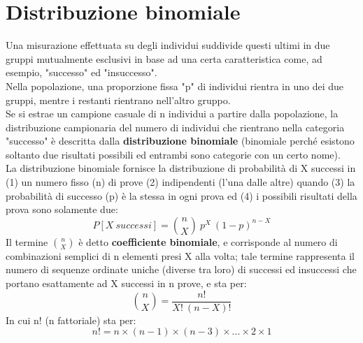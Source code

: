 \documentclass[drafts, 10pt]{book}
\begin{document}
\section{Distribuzione binomiale}
Una misurazione effettuata su degli individui suddivide questi ultimi in due gruppi mutualmente esclusivi in base ad una certa caratteristica come, ad esempio, "successo" ed "insuccesso".
\\
Nella popolazione, una proporzione fissa "p" di individui rientra in uno dei due gruppi, mentre i restanti rientrano nell'altro gruppo.
\\
Se si estrae un campione casuale di n individui a partire dalla popolazione, la distribuzione campionaria del numero di individui che rientrano nella categoria "successo" è descritta dalla \textbf{distribuzione binomiale} (binomiale perché esistono soltanto due risultati possibili ed entrambi sono categorie con un certo nome).
\\
La distribuzione binomiale fornisce la distribuzione di probabilità di X successi in (1) un numero fisso (n) di prove (2) indipendenti (l'una dalle altre) quando (3) la probabilità di successo (p) è la stessa in ogni prova ed (4) i possibili risultati della prova sono solamente due:
\begin{equation}
P[X \ successi] = \binom{n}{X} \ p^X \ (1 - p)^{n-X}
\end{equation}
Il termine $\binom{n}{X}$ è detto \textbf{coefficiente binomiale}, e corrisponde al numero di combinazioni semplici di n elementi presi X alla volta; tale termine rappresenta il numero di sequenze ordinate uniche (diverse tra loro) di successi ed insuccessi che portano esattamente ad X successi in n prove, e sta per:
\begin{equation}
\binom{n}{X} = \frac{n!}{X!\ (n - X)!}
\end{equation}
In cui n! (n fattoriale) sta per:
\begin{equation}
n! = n\times (n-1)\times (n-3)\times ...\times 2\times 1
\end{equation}
\end{document}
